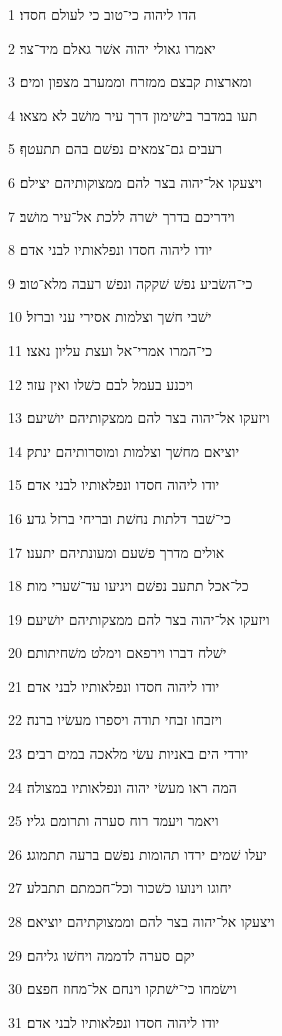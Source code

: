 \par 1 הדו ליהוה כי־טוב כי לעולם חסדו׃
\par 2 יאמרו גאולי יהוה אשׁר גאלם מיד־צר׃
\par 3 ומארצות קבצם ממזרח וממערב מצפון ומים׃
\par 4 תעו במדבר בישׁימון דרך עיר מושׁב לא מצאו׃
\par 5 רעבים גם־צמאים נפשׁם בהם תתעטף׃
\par 6 ויצעקו אל־יהוה בצר להם ממצוקותיהם יצילם׃
\par 7 וידריכם בדרך ישׁרה ללכת אל־עיר מושׁב׃
\par 8 יודו ליהוה חסדו ונפלאותיו לבני אדם׃
\par 9 כי־השׂביע נפשׁ שׁקקה ונפשׁ רעבה מלא־טוב׃
\par 10 ישׁבי חשׁך וצלמות אסירי עני וברזל׃
\par 11 כי־המרו אמרי־אל ועצת עליון נאצו׃
\par 12 ויכנע בעמל לבם כשׁלו ואין עזר׃
\par 13 ויזעקו אל־יהוה בצר להם ממצקותיהם יושׁיעם׃
\par 14 יוציאם מחשׁך וצלמות ומוסרותיהם ינתק׃
\par 15 יודו ליהוה חסדו ונפלאותיו לבני אדם׃
\par 16 כי־שׁבר דלתות נחשׁת ובריחי ברזל גדע׃
\par 17 אולים מדרך פשׁעם ומעונתיהם יתענו׃
\par 18 כל־אכל תתעב נפשׁם ויגיעו עד־שׁערי מות׃
\par 19 ויזעקו אל־יהוה בצר להם ממצקותיהם יושׁיעם׃
\par 20 ישׁלח דברו וירפאם וימלט משׁחיתותם׃
\par 21 יודו ליהוה חסדו ונפלאותיו לבני אדם׃
\par 22 ויזבחו זבחי תודה ויספרו מעשׂיו ברנה׃
\par 23 יורדי הים באניות עשׂי מלאכה במים רבים׃
\par 24 המה ראו מעשׂי יהוה ונפלאותיו במצולה׃
\par 25 ויאמר ויעמד רוח סערה ותרומם גליו׃
\par 26 יעלו שׁמים ירדו תהומות נפשׁם ברעה תתמוגג׃
\par 27 יחוגו וינועו כשׁכור וכל־חכמתם תתבלע׃
\par 28 ויצעקו אל־יהוה בצר להם וממצוקתיהם יוציאם׃
\par 29 יקם סערה לדממה ויחשׁו גליהם׃
\par 30 וישׂמחו כי־ישׁתקו וינחם אל־מחוז חפצם׃
\par 31 יודו ליהוה חסדו ונפלאותיו לבני אדם׃
